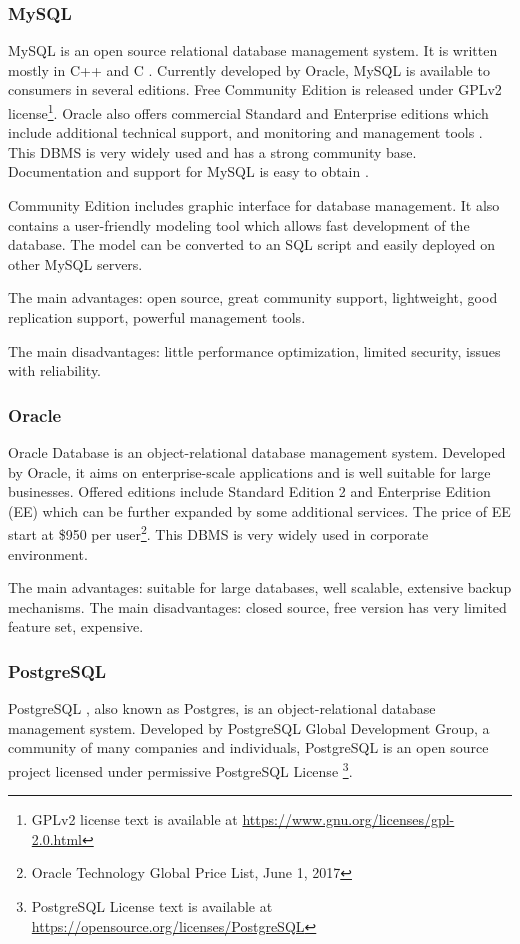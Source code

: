 		\subsubsection*{MySQL}
		MySQL \cite{mysql} is an open source relational database management system. It is written mostly in C++ and C \cite{mysqllanguage}.  Currently developed by Oracle, MySQL is available to consumers in several editions. Free Community Edition is released under GPLv2 license\footnote{GPLv2 license text is available at \url{https://www.gnu.org/licenses/gpl-2.0.html}}. Oracle also offers commercial Standard and Enterprise editions which include additional technical support, and monitoring and management tools \cite{mysqleditions}. This DBMS is very widely used and has a strong community base. Documentation and support for MySQL is easy to obtain \cite{mysqlbook}. 
		
		Community Edition includes graphic interface for database management. It also contains a user-friendly modeling tool which allows fast development of the database. The model can be converted to an SQL script and easily deployed on other MySQL servers.
		
		The main advantages: open source, great community support, lightweight, good replication support, powerful management tools.
		
		The main disadvantages: little performance optimization, limited security,  issues with reliability.
		
		\subsubsection*{Oracle}
		Oracle Database \cite{oracledb} is an object-relational database management system. Developed by Oracle, it aims on enterprise-scale applications and is well suitable for large businesses. Offered editions include Standard Edition 2 and Enterprise Edition (EE) which can be further expanded by some additional services. The price of EE start at \$950 per user\footnote{Oracle Technology Global Price List, June 1, 2017}. This DBMS is very widely used in corporate environment.
		
		The main advantages: suitable for large databases, well scalable, extensive backup mechanisms.
		The main disadvantages: closed source, free version has very limited feature set, expensive.
		 
		\subsubsection*{PostgreSQL}
		PostgreSQL \cite{postgres}, also known as Postgres, is an object-relational database management system. Developed by PostgreSQL Global Development Group, a community of many companies and individuals, PostgreSQL is an open source project licensed under permissive PostgreSQL License \footnote{PostgreSQL License text is available at \url{https://opensource.org/licenses/PostgreSQL}}.
		
